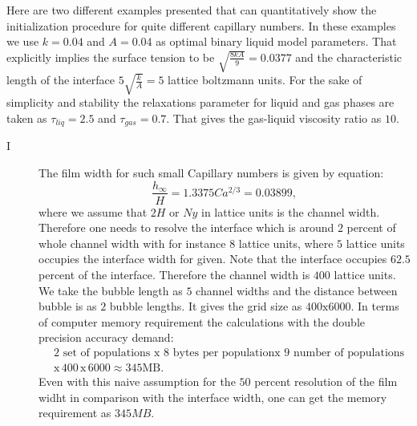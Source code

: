 \documentclass{article}
\begin{document}
Here are two different examples presented that can quantitatively show the
initialization procedure for quite different capillary numbers. In these
examples we use $k=0.04$ and $A=0.04$ as optimal binary liquid model parameters.
That explicitly implies the surface tension to be $\sqrt{\frac{8 k
A}{9}}=0.0377$ and the characteristic length of the interface
$5\sqrt{\frac{k}{A}}=5$ lattice boltzmann units. For the sake of simplicity and
stability the relaxations parameter for liquid and gas phases are taken as
$\tau_{liq}=2.5$ and $\tau_{gas}=0.7$. That gives the gas-liquid viscosity ratio
as $10$.  
\begin{description}
 \item[I ]
  The film width for such small Capillary numbers \cite{bretherton} is
given by equation:
  \begin{equation}
  \frac{h_{\infty}}{H}=1.3375 Ca^{2/3}=0.03899,
  \end{equation}
  where we assume that $2 H$ or $Ny$ in lattice units is the channel width.
Therefore one needs to resolve the interface which is around $2$ percent of
  whole channel width with for instance $8$ lattice units, where $5$ lattice
units occupies the interface width for given. Note that the interface occupies
$62.5$ percent of the interface.  Therefore the channel
  width is $400$ lattice units. We take the bubble length as $5$ channel widths
  and the distance between bubble is as $2$ bubble lengths. It gives the
grid size as $400\mathrm{x}6000$. In terms of computer memory
requirement the calculations with the double precision accuracy demand:
\begin{equation}
\begin{aligned}
&2\text{ set of populations }\mathrm{x}\,\, 8\,\, \text{bytes per population
}\mathrm{x}\,\, 9 \text{ number of
populations}\\
&\mathrm{x}\,400\,\mathrm{x}\,6000\approx 345 \mathrm{MB}. 
\end{aligned}
\end{equation}
Even with this naive assumption for the $50$ percent resolution of the film
widht in comparison with the interface width, one can get the memory
requirement as $345 MB$. 


\end{description}
\end{document}

